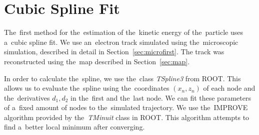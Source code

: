 	\section{Cubic Spline Fit}
	\label{sec:cspline}
		The~first method for the~estimation of the~kinetic energy of the~particle uses a~cubic spline fit. We use an~electron track simulated using the~microscopic simulation, described in detail in Section~\ref{sec:microfirst}. The track was reconstructed using the~map described in Section~\ref{sec:map}.
				
		In order to calculate the~spline, we use the~class \textit{TSpline3} from ROOT. This allows us to evaluate the~spline using the~coordinates $(x_n,z_n)$ of each node and the~derivatives $d_1,d_2$ in the~first and the~last node. We can fit these parameters of a~fixed amount of nodes to the~simulated trajectory. We use the~IMPROVE algorithm provided by the~\textit{TMinuit} class in ROOT. This algorithm attempts to find a~better local minimum after converging.
		
